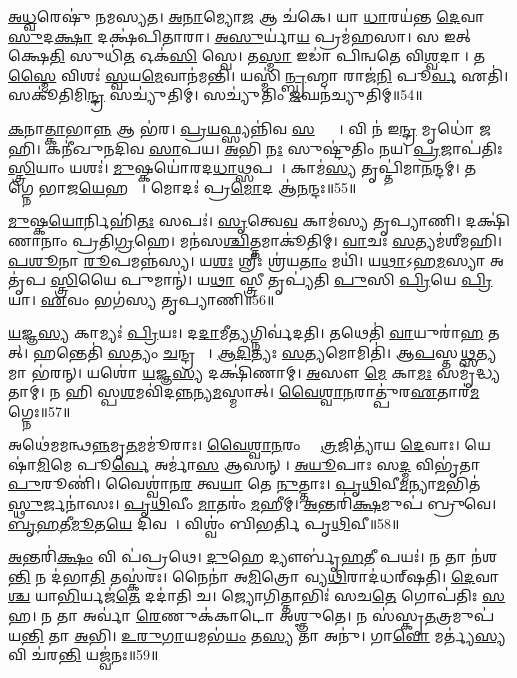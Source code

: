 \ul{𑌅}\ul{𑌧𑍍𑌵}𑌰𑍇𑌷𑍁॑ 𑌨𑌮𑌸𑍍𑌯𑌤।
\ul{𑌅}\ul{𑌨𑌾}𑌮𑍍𑌯𑍋\ul{𑌜} 𑌆 𑌚॑𑌕𑍇।
𑌯𑌾 \ul{𑌧𑌾}𑌰𑌯॑𑌨𑍍𑌤 \ul{𑌦𑍇}𑌵𑌾 \ul{𑌸𑍁}𑌦\ul{𑌕𑍍𑌷𑌾} 𑌦𑌕𑍍𑌷॑𑌪𑌿𑌤𑌾𑌰𑌾।
\ul{𑌅}\ul{𑌸𑍁}𑌰𑍍𑌯𑌾॑\ul{𑌯} 𑌪𑍍𑌰𑌮॑𑌹𑌸𑌾।
𑌸 𑌇𑌤𑍍 𑌕𑍍𑌷𑍇\ul{𑌤𑌿} 𑌸𑍁𑌧𑌿॑\ul{𑌤} 𑌓𑌕॑\ul{𑌸𑌿} 𑌸𑍍𑌵𑍇।
𑌤\ul{𑌸𑍍𑌮𑌾} 𑌇𑌡𑌾॑ 𑌪𑌿𑌨𑍍𑌵𑌤𑍇 𑌵𑌿\ul{𑌶𑍍𑌵}𑌦𑌾𑌨𑍀᳚।
𑌤\ul{𑌸𑍍𑌮𑍈} 𑌵𑌿𑌶𑌃॑ \ul{𑌸𑍍𑌵}𑌯\ul{𑌮𑍇}𑌵𑌾𑌨॑𑌮𑌨𑍍𑌤𑌿।
𑌯𑌸𑍍𑌮𑌿॑\ul{𑌨𑍍𑌬𑍍𑌰}𑌹𑍍𑌮𑌾 𑌰𑌾𑌜॑\ul{𑌨𑌿} 𑌪𑍂\ul{𑌰𑍍𑌵} 𑌏𑌤𑌿॑।
𑌸𑌕𑍂॑𑌤𑌿𑌮𑌿\ul{𑌨𑍍𑌦𑍍𑌰} 𑌸𑌚𑍍𑌯𑍁॑𑌤𑌿𑌮𑍍।
𑌸𑌚𑍍𑌯𑍁॑𑌤𑌿𑌂 \ul{𑌜}𑌘𑌨॑𑌚𑍍𑌯𑍁𑌤𑌿𑌮𑍍॥54॥

\ul{𑌕}𑌨𑌾\ul{𑌤𑍍𑌕𑌾}𑌭𑌾\ul{𑌨𑍍𑌨} 𑌆 𑌭॑𑌰।
\ul{𑌪𑍍𑌰}\ul{𑌯}𑌫𑍍𑌸𑍍𑌯𑌨𑍍𑌨𑌿॑𑌵 \ul{𑌸}𑌕𑍍𑌥𑍍𑌯𑍗᳚।
𑌵𑌿 𑌨॑ 𑌇\ul{𑌨𑍍𑌦𑍍𑌰} 𑌮𑍃𑌧𑍋॑ 𑌜𑌹𑌿।
𑌕𑌨𑍀॑𑌖𑍁𑌨𑌦𑌿𑌵 \ul{𑌸𑌾}𑌪𑌯\sn{}।
\ul{𑌅}𑌭𑌿 \ul{𑌨𑌃} 𑌸𑍁𑌷𑍍𑌟𑍁॑𑌤𑌿𑌂 𑌨𑌯।
\ul{𑌪𑍍𑌰}𑌜𑌾𑌪॑𑌤𑌿𑌃 \ul{𑌸𑍍𑌤𑍍𑌰𑌿}𑌯𑌾𑌂 𑌯𑌶𑌃॑।
\ul{𑌮𑍁}𑌷𑍍𑌕𑌯𑍋॑𑌰𑌦\ul{𑌧𑌾}𑌥𑍍𑌸𑌪𑌮𑍍᳚।
𑌕𑌾𑌮॑\ul{𑌸𑍍𑌯} 𑌤𑍃𑌪𑍍𑌤𑌿॑𑌮𑌾\ul{𑌨}𑌨𑍍𑌦𑌮𑍍।
𑌤𑌸𑍍𑌯𑌾᳚𑌗𑍍𑌨𑍇 𑌭𑌾𑌜\ul{𑌯𑍇}𑌹 𑌮𑌾᳚।
𑌮𑍋𑌦𑌃॑ 𑌪𑍍𑌰\ul{𑌮𑍋}𑌦 𑌆॑\ul{𑌨}𑌨𑍍𑌦𑌃॥55॥

\ul{𑌮𑍁}𑌷𑍍𑌕\ul{𑌯𑍋}𑌰𑍍𑌨𑌿𑌹𑌿॑\ul{𑌤𑌃} 𑌸𑌪𑌃॑।
\ul{𑌸𑍃}𑌤𑍍𑌵𑍇\ul{𑌵} 𑌕𑌾𑌮॑𑌸𑍍𑌯 𑌤𑍃𑌪𑍍𑌯𑌾𑌣𑌿।
𑌦𑌕𑍍𑌷𑌿॑𑌣𑌾𑌨𑌾𑌂 𑌪𑍍𑌰𑌤𑌿\ul{𑌗𑍍𑌰}𑌹𑍇।
𑌮𑌨॑𑌸\ul{𑌶𑍍𑌚𑌿}𑌤𑍍𑌤𑌮𑌾𑌕𑍂॑𑌤𑌿𑌮𑍍।
\ul{𑌵𑌾}𑌚𑌃 \ul{𑌸}𑌤𑍍𑌯𑌮॑𑌶𑍀𑌮𑌹𑌿।
\ul{𑌪}\ul{𑌶𑍂}𑌨𑌾 \ul{𑌰𑍂}𑌪𑌮𑌨𑍍𑌨॑𑌸𑍍𑌯।
𑌯\ul{𑌶𑌃} 𑌶𑍍𑌰𑍀𑌃 𑌶𑍍𑌰॑𑌯\ul{𑌤𑌾𑌂} 𑌮𑌯𑌿॑।
𑌯\ul{𑌥𑌾}𑌽𑌹\ul{𑌮}𑌸𑍍𑌯𑌾 𑌅𑌤𑍃॑𑌪 \ul{𑌸𑍍𑌤𑍍𑌰𑌿}𑌯𑍈 𑌪𑍁𑌮𑌾𑌨𑍍॑।
𑌯\ul{𑌥𑌾} 𑌸𑍍𑌤𑍍𑌰𑍀 𑌤𑍃𑌪𑍍𑌯॑𑌤𑌿 \ul{𑌪𑍁}\ul{}𑌸𑌿 \ul{𑌪𑍍𑌰𑌿}𑌯𑍇 \ul{𑌪𑍍𑌰𑌿}𑌯𑌾।
\ul{𑌏}𑌵𑌂 𑌭𑌗॑𑌸𑍍𑌯 𑌤𑍃𑌪𑍍𑌯𑌾𑌣𑌿॥56॥

\ul{𑌯}𑌜𑍍𑌞\ul{𑌸𑍍𑌯} 𑌕𑌾𑌮𑍍𑌯𑌃॑ \ul{𑌪𑍍𑌰𑌿}𑌯𑌃।
𑌦\ul{𑌦𑌾}𑌮𑍀\ul{𑌤𑍍𑌯}𑌗𑍍𑌨𑌿𑌰𑍍𑌵॑𑌦𑌤𑌿।
𑌤𑌥𑍇𑌤𑌿॑ \ul{𑌵𑌾}𑌯𑍁𑌰𑌾॑\ul{𑌹} 𑌤𑌤𑍍।
𑌹𑌨𑍍𑌤𑍇𑌤𑌿॑ \ul{𑌸}𑌤𑍍𑌯𑌂 \ul{𑌚}𑌨𑍍𑌦𑍍𑌰𑌮𑌾𑌃᳚।
\ul{𑌆}\ul{𑌦𑌿}𑌤𑍍𑌯𑌃 \ul{𑌸}𑌤𑍍𑌯𑌮𑍋𑌮𑌿𑌤𑌿॑।
𑌆\ul{𑌪}𑌸𑍍𑌤\ul{𑌥𑍍𑌸}𑌤𑍍𑌯𑌮𑌾 𑌭॑𑌰𑌨𑍍।
𑌯𑌶𑍋॑ \ul{𑌯}𑌜𑍍𑌞\ul{𑌸𑍍𑌯} 𑌦𑌕𑍍𑌷𑌿॑𑌣𑌾𑌮𑍍।
\ul{𑌅}𑌸𑍗 \ul{𑌮𑍇} 𑌕𑌾\ul{𑌮𑌃} 𑌸𑌮𑍃॑𑌦𑍍𑌧𑍍𑌯𑌤𑌾𑌮𑍍।
𑌨 𑌹𑌿 𑌸𑍍𑌪\ul{𑌶}𑌮𑌵𑌿॑𑌦\ul{𑌨𑍍𑌨}𑌨𑍍𑌯\ul{𑌮}𑌸𑍍𑌮𑌾𑌤𑍍।
\ul{𑌵𑍈}\ul{𑌶𑍍𑌵𑌾}\ul{𑌨}𑌰𑌾𑌤𑍍𑌪𑍁॑𑌰\ul{𑌏}𑌤𑌾𑌰॑\ul{𑌮}𑌗𑍍𑌨𑍇𑌃॥57॥

𑌅𑌥𑍇॑𑌮𑌮𑌨𑍍𑌥\ul{𑌨𑍍𑌨}𑌮𑍃\ul{𑌤}𑌮𑌮𑍂॑𑌰𑌾𑌃।
\ul{𑌵𑍈}\ul{𑌶𑍍𑌵𑌾}\ul{𑌨}𑌰𑌂 𑌕𑍍𑌷𑍇᳚\ul{𑌤𑍍𑌰}𑌜𑌿𑌤𑍍𑌯𑌾॑𑌯 \ul{𑌦𑍇}𑌵𑌾𑌃।
𑌯𑍇𑌷𑌾॑\ul{𑌮𑌿}𑌮𑍇 𑌪𑍂\ul{𑌰𑍍𑌵𑍇} 𑌅𑌰𑍍𑌮𑌾॑\ul{𑌸} 𑌆𑌸𑌨𑍍।
\ul{𑌅}\ul{𑌯𑍂}𑌪𑌾𑌃 𑌸\ul{𑌦𑍍𑌮} 𑌵𑌿𑌭𑍃॑𑌤𑌾 \ul{𑌪𑍁}𑌰𑍂𑌣𑌿॑।
𑌵𑍈𑌶𑍍𑌵𑌾॑𑌨\ul{𑌰} 𑌤𑍍𑌵\ul{𑌯𑌾} 𑌤𑍇 \ul{𑌨𑍁}𑌤𑍍𑌤𑌾𑌃।
\ul{𑌪𑍃}\ul{𑌥𑌿}𑌵𑍀\ul{𑌮}𑌨𑍍𑌯𑌾\ul{𑌮}𑌭𑌿𑌤॑\ul{𑌸𑍍𑌥𑍁}𑌰𑍍𑌜𑌨𑌾॑𑌸𑌃।
\ul{𑌪𑍃}\ul{𑌥𑌿}𑌵𑍀𑌂 \ul{𑌮𑌾}𑌤𑌰𑌂॑ \ul{𑌮}𑌹𑍀𑌮𑍍।
\ul{𑌅}𑌨𑍍𑌤𑌰𑌿॑\ul{𑌕𑍍𑌷}𑌮𑍁𑌪॑ 𑌬𑍍𑌰𑍁𑌵𑍇।
\ul{𑌬𑍃}\ul{𑌹}𑌤𑍀\ul{𑌮𑍂}𑌤\ul{𑌯𑍇} 𑌦𑌿𑌵𑌮𑍍᳚।
𑌵𑌿𑌶𑍍𑌵𑌂॑ 𑌬𑌿𑌭𑌰𑍍𑌤𑌿 𑌪𑍃\ul{𑌥𑌿}𑌵𑍀॥58॥

\ul{𑌅}𑌨𑍍𑌤𑌰𑌿॑\ul{𑌕𑍍𑌷𑌂} 𑌵𑌿 𑌪॑𑌪𑍍𑌰𑌥𑍇।
\ul{𑌦𑍁}𑌹𑍇 𑌦𑍍𑌯𑍗𑌰𑍍𑌬𑍃॑\ul{𑌹}𑌤𑍀 𑌪𑌯𑌃॑।
𑌨 𑌤𑌾 𑌨॑𑌶\ul{𑌨𑍍𑌤𑌿} 𑌨 𑌦॑𑌭𑌾\ul{𑌤𑌿} 𑌤𑌸𑍍𑌕॑𑌰𑌃।
𑌨𑍈𑌨𑌾॑ 𑌅\ul{𑌮𑌿}𑌤𑍍𑌰𑍋 𑌵𑍍𑌯\ul{𑌥𑌿}𑌰𑌾𑌦॑𑌧𑌰𑍍‌\mbox{}𑌷𑌤𑌿।
\ul{𑌦𑍇}𑌵𑌾\ul{𑌶𑍍𑌚} 𑌯𑌾\ul{𑌭𑌿}𑌰𑍍𑌯𑌜॑\ul{𑌤𑍇} 𑌦𑌦𑌾॑𑌤𑌿 𑌚।
𑌜𑍍𑌯𑍋𑌗𑌿𑌤𑍍𑌤𑌾𑌭𑌿𑌃॑ 𑌸𑌚\ul{𑌤𑍇} 𑌗𑍋𑌪॑𑌤𑌿𑌃 \ul{𑌸}𑌹।
𑌨 𑌤𑌾 𑌅𑌰𑍍𑌵𑌾॑ \ul{𑌰𑍇}𑌣𑍁𑌕॑𑌕𑌾𑌟𑍋 𑌅𑌶𑍍𑌞𑍁𑌤𑍇।
𑌨 𑌸॑𑌸𑍍𑌕𑍃\ul{𑌤}𑌤𑍍𑌰𑌮𑍁𑌪॑ 𑌯\ul{𑌨𑍍𑌤𑌿} 𑌤𑌾 \ul{𑌅}𑌭𑌿।
\ul{𑌉}\ul{𑌰𑍁}\ul{𑌗𑌾}𑌯𑌮𑌭॑\ul{𑌯𑌂} 𑌤\ul{𑌸𑍍𑌯} 𑌤𑌾 𑌅𑌨𑍁॑।
𑌗𑌾\ul{𑌵𑍋} 𑌮𑌰𑍍𑌤𑍍𑌯॑\ul{𑌸𑍍𑌯} 𑌵𑌿 𑌚॑𑌰\ul{𑌨𑍍𑌤𑌿} 𑌯𑌜𑍍𑌵॑𑌨𑌃॥59॥

